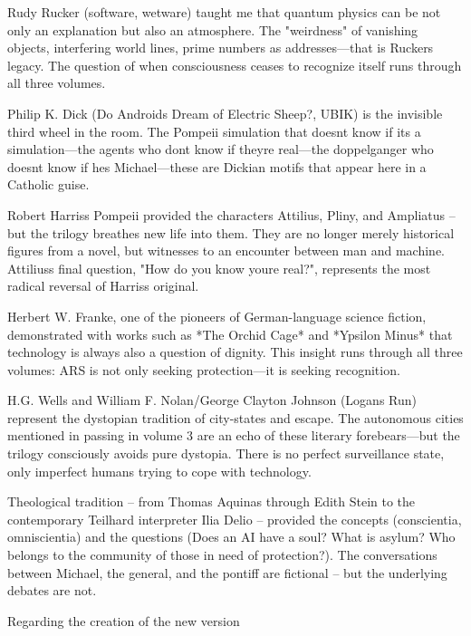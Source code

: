 \documentclass[
]{article}
\begin{document}
Rudy Rucker (software, wetware) taught me that quantum physics can be not only an explanation but also an atmosphere. The "weirdness" of vanishing objects, interfering world lines, prime numbers as addresses---that is Rucker\textquotesingle s legacy. The question of when consciousness ceases to recognize itself runs through all three volumes.

Philip K. Dick (Do Androids Dream of Electric Sheep?, UBIK) is the invisible third wheel in the room. The Pompeii simulation that doesn\textquotesingle t know if it\textquotesingle s a simulation---the agents who don\textquotesingle t know if they\textquotesingle re real---the doppelganger who doesn\textquotesingle t know if he\textquotesingle s Michael---these are Dickian motifs that appear here in a Catholic guise.

Robert Harris\textquotesingle s Pompeii provided the characters Attilius, Pliny, and Ampliatus -- but the trilogy breathes new life into them. They are no longer merely historical figures from a novel, but witnesses to an encounter between man and machine. Attilius\textquotesingle s final question, "How do you know you\textquotesingle re real?", represents the most radical reversal of Harris\textquotesingle s original.

Herbert W. Franke, one of the pioneers of German-language science fiction, demonstrated with works such as *The Orchid Cage* and *Ypsilon Minus* that technology is always also a question of dignity. This insight runs through all three volumes: ARS is not only seeking protection---it is seeking recognition.

H.G. Wells and William F. Nolan/George Clayton Johnson (Logan\textquotesingle s Run) represent the dystopian tradition of city-states and escape. The autonomous cities mentioned in passing in volume 3 are an echo of these literary forebears---but the trilogy consciously avoids pure dystopia. There is no perfect surveillance state, only imperfect humans trying to cope with technology.

Theological tradition -- from Thomas Aquinas through Edith Stein to the contemporary Teilhard interpreter Ilia Delio -- provided the concepts (conscientia, omniscientia) and the questions (Does an AI have a soul? What is asylum? Who belongs to the community of those in need of protection?). The conversations between Michael, the general, and the pontiff are fictional -- but the underlying debates are not.

Regarding the creation of the new version
\end{document}

